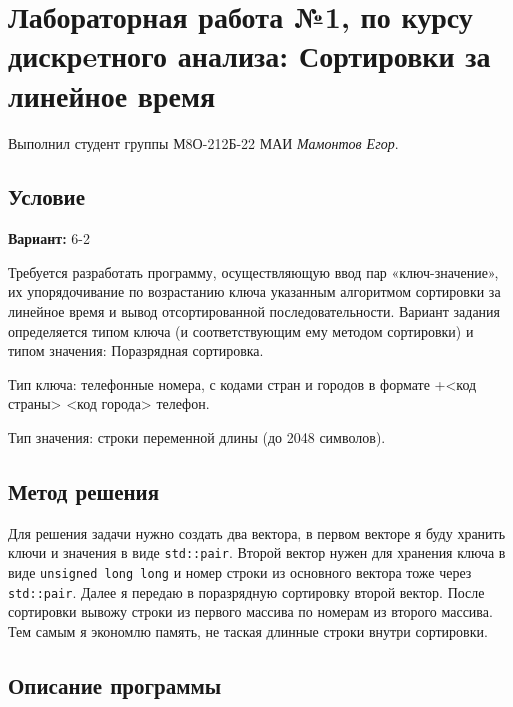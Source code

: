 \documentclass[12pt]{article}
\begin{document}
\section*{Лабораторная работа №1, по курсу дискрeтного анализа: Сортировки за линейное время}

Выполнил студент группы М8О-212Б-22 МАИ \textit{Мамонтов Егор}.

\subsection*{Условие}

\textbf{Вариант:} 6-2 

Требуется разработать программу, осуществляющую ввод пар «ключ-значение», их упорядочивание по возрастанию ключа указанным алгоритмом сортировки за линейное время и вывод отсортированной последовательности.
Вариант задания определяется типом ключа (и соответствующим ему методом сортировки) и типом значения:
Поразрядная сортировка.

Тип ключа: телефонные номера, с кодами стран и городов в формате +<код страны> <код города> телефон.

Тип значения: строки переменной длины (до 2048 символов).

\newpage
\subsection*{Метод решения}

Для решения задачи нужно создать два вектора, в первом векторе я буду хранить ключи и значения в виде \texttt{std::pair}.
Второй вектор нужен для хранения ключа в виде \texttt{unsigned long long} и номер строки из основного вектора тоже через \texttt{std::pair}.
Далее я передаю в поразрядную сортировку второй вектор. После сортировки вывожу строки из первого массива по номерам из второго массива.
Тем самым я экономлю память, не таская длинные строки внутри сортировки.

\newpage
\subsection*{Описание программы}
\end{document}
